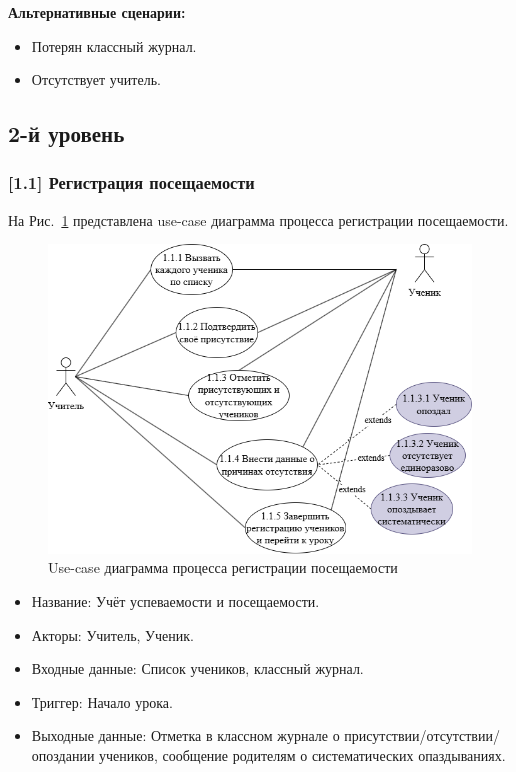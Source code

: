 \documentclass[a4paper, final]{article}
\begin{document}
\textbf{Альтернативные сценарии:}
\begin{itemize}
  \item[1.1.1] Потерян классный журнал.
  \item[1.1.2] Отсутствует учитель.
\end{itemize}

\subsection{2-й уровень}
\subsubsection{[1.1] Регистрация посещаемости}
На Рис.~\ref{img:use_case21} представлена use-case диаграмма процесса регистрации посещаемости.

\begin{figure}[H]
  \centering
  \includegraphics[width=0.85\linewidth]{use_case21.png}
  \caption{Use-case диаграмма процесса регистрации посещаемости}
  \label{img:use_case21}
\end{figure}

\begin{itemize}
  \item Название: Учёт успеваемости и посещаемости.
  \item Акторы: Учитель, Ученик.
  \item Входные данные: Список учеников, классный журнал.
  \item Триггер: Начало урока.
  \item Выходные данные: Отметка в классном журнале о присутствии/отсутствии/опоздании учеников, сообщение родителям о систематических опаздываниях.
\end{itemize}
\end{document}
